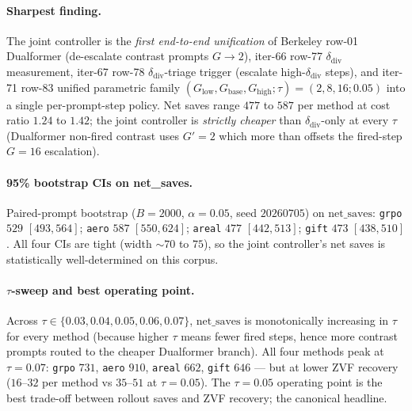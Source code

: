 \paragraph{Sharpest finding.}
The joint controller is the \emph{first end-to-end unification} of
Berkeley row-01 Dualformer (de-escalate contrast prompts $G{\to}2$),
iter-66 row-77 $\delta_{\mathrm{div}}$ measurement, iter-67 row-78
$\delta_{\mathrm{div}}$-triage trigger (escalate high-$\delta_{\mathrm{div}}$
steps), and iter-71 row-83 unified parametric family
$(G_{\mathrm{low}}, G_{\mathrm{base}}, G_{\mathrm{high}}; \tau)
= (2, 8, 16; 0.05)$ into a single per-prompt-step policy. Net saves
range $477$ to $587$ per method at cost ratio $1.24$ to $1.42$; the
joint controller is \emph{strictly cheaper} than
$\delta_{\mathrm{div}}$-only at every $\tau$ (Dualformer non-fired
contrast uses $G'{=}2$ which more than offsets the fired-step $G{=}16$
escalation).

\paragraph{95\% bootstrap CIs on net\_saves.}
Paired-prompt bootstrap ($B{=}2000$, $\alpha{=}0.05$, seed $20260705$)
on $\mathrm{net\_saves}$: \texttt{grpo} $529$ $[493, 564]$;
\texttt{aero} $587$ $[550, 624]$; \texttt{areal} $477$ $[442, 513]$;
\texttt{gift} $473$ $[438, 510]$. All four CIs are tight (width
$\sim 70$ to $75$), so the joint controller's net saves is statistically
well-determined on this corpus.

\paragraph{$\tau$-sweep and best operating point.}
Across $\tau \in \{0.03, 0.04, 0.05, 0.06, 0.07\}$, $\mathrm{net\_saves}$
is monotonically increasing in $\tau$ for every method (because higher
$\tau$ means fewer fired steps, hence more contrast prompts routed to
the cheaper Dualformer branch). All four methods peak at
$\tau{=}0.07$: \texttt{grpo} $731$, \texttt{aero} $910$,
\texttt{areal} $662$, \texttt{gift} $646$ — but at lower ZVF recovery
($16$–$32$ per method vs $35$–$51$ at $\tau{=}0.05$). The
$\tau{=}0.05$ operating point is the best trade-off between rollout
saves and ZVF recovery; the canonical headline.

